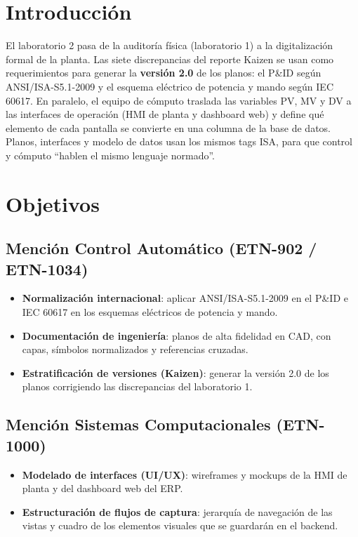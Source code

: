 \documentclass[a4paper,11pt]{article}
\begin{document}

\tableofcontents
\newpage

\section{Introducción}
El laboratorio 2 pasa de la auditoría física (laboratorio 1) a la digitalización formal de la planta. Las siete discrepancias del reporte Kaizen se usan como requerimientos para generar la \textbf{versión 2.0} de los planos: el P\&ID según ANSI/ISA-S5.1-2009 y el esquema eléctrico de potencia y mando según IEC 60617. En paralelo, el equipo de cómputo traslada las variables PV, MV y DV a las interfaces de operación (HMI de planta y dashboard web) y define qué elemento de cada pantalla se convierte en una columna de la base de datos. Planos, interfaces y modelo de datos usan los mismos tags ISA, para que control y cómputo ``hablen el mismo lenguaje normado''.

\section{Objetivos}
\subsection{Mención Control Automático (ETN-902 / ETN-1034)}
\begin{itemize}
\item \textbf{Normalización internacional}: aplicar ANSI/ISA-S5.1-2009 en el P\&ID e IEC 60617 en los esquemas eléctricos de potencia y mando.
\item \textbf{Documentación de ingeniería}: planos de alta fidelidad en CAD, con capas, símbolos normalizados y referencias cruzadas.
\item \textbf{Estratificación de versiones (Kaizen)}: generar la versión 2.0 de los planos corrigiendo las discrepancias del laboratorio 1.
\end{itemize}
\subsection{Mención Sistemas Computacionales (ETN-1000)}
\begin{itemize}
\item \textbf{Modelado de interfaces (UI/UX)}: wireframes y mockups de la HMI de planta y del dashboard web del ERP.
\item \textbf{Estructuración de flujos de captura}: jerarquía de navegación de las vistas y cuadro de los elementos visuales que se guardarán en el backend.
\end{itemize}
\end{document}
